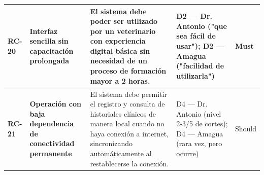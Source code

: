 \documentclass[
]{article}
\newcounter{none} %
\begin{document}
{\def\LTcaptype{none} %
\begin{longtable}[]{@{}
  >{\raggedright\arraybackslash}p{}
  >{\raggedright\arraybackslash}p{}
  >{\raggedright\arraybackslash}p{}
  >{\raggedright\arraybackslash}p{}
  >{\centering\arraybackslash}p{}@{}}
\toprule\noalign{}
\begin{minipage}[b]{\linewidth}\raggedright
\textbf{RC-20}
\end{minipage} & \begin{minipage}[b]{\linewidth}\raggedright
\textbf{Interfaz sencilla sin capacitación prolongada}
\end{minipage} & \begin{minipage}[b]{\linewidth}\raggedright
El sistema debe poder ser utilizado por un veterinario con experiencia
digital básica sin necesidad de un proceso de formación mayor a 2 horas.
\end{minipage} & \begin{minipage}[b]{\linewidth}\raggedright
D2 --- Dr. Antonio ("que sea fácil de usar"); D2 --- Amagua ("facilidad de utilizarla")
\end{minipage} & \begin{minipage}[b]{\linewidth}\centering
\textbf{Must}
\end{minipage} \\
\midrule\noalign{}
\endhead
\bottomrule\noalign{}
\endlastfoot
\begin{minipage}[t]{\linewidth}\raggedright
\textbf{RC-21}
\end{minipage} & \begin{minipage}[t]{\linewidth}\raggedright
\textbf{Operación con baja dependencia de conectividad permanente}
\end{minipage} & \begin{minipage}[t]{\linewidth}\raggedright
El sistema debe permitir el registro y consulta de historiales clínicos
de manera local cuando no haya conexión a internet, sincronizando
automáticamente al restablecerse la conexión.
\end{minipage} & \begin{minipage}[t]{\linewidth}\raggedright
D4 --- Dr. Antonio (nivel 2-3/5 de cortes); D4 --- Amagua (rara vez, pero ocurre)
\end{minipage} & Should \\

\end{longtable}}
\end{document}
